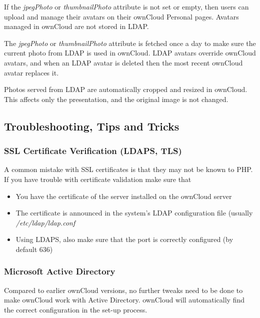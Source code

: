 \documentclass[letterpaper,10pt,english]{sphinxmanual}
\begin{document}
If the \emph{jpegPhoto} or \emph{thumbnailPhoto} attribute is not set or empty, then
users can upload and manage their avatars on their ownCloud Personal pages.
Avatars managed in ownCloud are not stored in LDAP.

The \emph{jpegPhoto} or \emph{thumbnailPhoto} attribute is fetched once a day to make
sure the current photo from LDAP is used in ownCloud. LDAP avatars override
ownCloud avatars, and when an LDAP avatar is deleted then the most recent
ownCloud avatar replaces it.

Photos served from LDAP are automatically cropped and resized in ownCloud. This
affects only the presentation, and the original image is not changed.


\subsection{Troubleshooting, Tips and Tricks}
\label{configuration_user/user_auth_ldap:troubleshooting-tips-and-tricks}

\subsubsection{SSL Certificate Verification (LDAPS, TLS)}
\label{configuration_user/user_auth_ldap:ssl-certificate-verification-ldaps-tls}
A common mistake with SSL certificates is that they may not be known to PHP.
If you have trouble with certificate validation make sure that
\begin{itemize}
\item {} 
You have the certificate of the server installed on the ownCloud server

\item {} 
The certificate is announced in the system's LDAP configuration file (usually
\emph{/etc/ldap/ldap.conf}

\end{itemize}
\begin{itemize}
\item {} 
Using LDAPS, also make sure that the port is correctly configured (by default
636)

\end{itemize}


\subsubsection{Microsoft Active Directory}
\label{configuration_user/user_auth_ldap:microsoft-active-directory}
Compared to earlier ownCloud versions, no further tweaks need to be done to
make ownCloud work with Active Directory. ownCloud will automatically find the
correct configuration in the set-up process.
\end{document}
